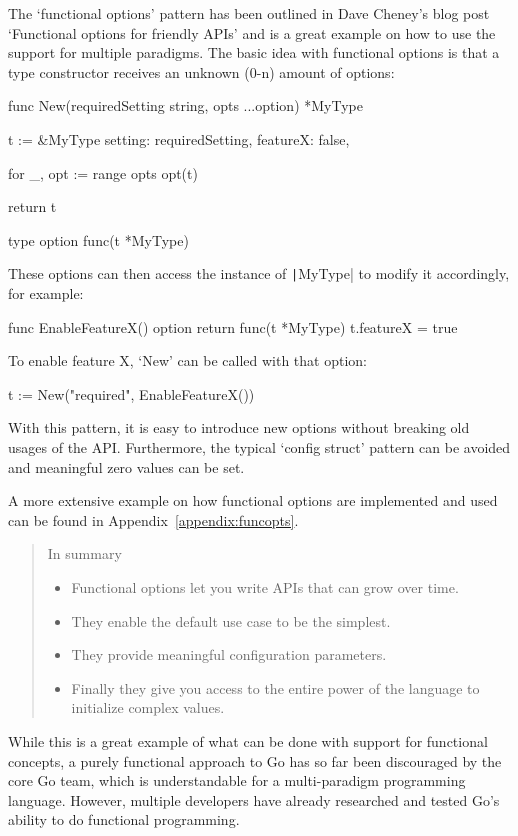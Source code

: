 The `functional options' pattern has been outlined in Dave Cheney's blog post `Functional options
for friendly APIs' and is a great example on how to use the support for multiple paradigms.
The basic idea with functional options is that a type constructor receives an unknown (0-n) amount
of options:
\begin{gocode}
func New(requiredSetting string, opts ...option) *MyType {
	t := &MyType{
		setting: requiredSetting,
		featureX: false,
	}

	for _, opt := range opts {
		opt(t)
	}

	return t
}

type option func(t *MyType)
\end{gocode}

These options can then access the instance of \texttt|MyType| to modify it accordingly,
for example:

\begin{gocode}
func EnableFeatureX() option {
	return func(t *MyType) {
		t.featureX = true
	}
}
\end{gocode}

To enable feature X, `New' can be called with that option:
\begin{gocode}
t := New("required", EnableFeatureX())
\end{gocode}

With this pattern, it is easy to introduce new options without breaking old usages of the API.
Furthermore, the typical `config struct' pattern can be avoided and meaningful zero values
can be set.

A more extensive example on how functional options are implemented and used can be found in
Appendix~\ref{appendix:funcopts}.

\begin{quote}
    In summary
    \begin{itemize}
        \item Functional options let you write APIs that can grow over time.
        \item They enable the default use case to be the simplest.
        \item They provide meaningful configuration parameters.
        \item Finally they give you access to the entire power of the language to initialize complex values.
    \end{itemize}\autocite{functional-options}
\end{quote}

While this is a great example of what can be done with support for functional concepts, a purely functional approach to
Go has so far been discouraged by the core Go team, which is understandable for a multi-paradigm programming language.
However, multiple developers have already researched and tested Go's ability to do functional programming.

